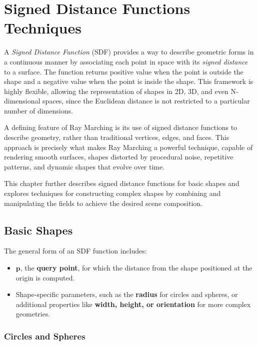 \chapter{Signed Distance Functions Techniques}\label{chp:LABEL_CHP_3}

A \textit{Signed Distance Function} (SDF) provides a way to describe geometric forms in a continuous manner by associating each point in space with its \textit{signed distance} to a surface. The function returns positive value when the point is outside the shape and a negative value when the point is inside the shape. This framework is highly flexible, allowing the representation of shapes in 2D, 3D, and even N-dimensional spaces, since the Euclidean distance is not restricted to a particular number of dimensions.  

A defining feature of Ray Marching is its use of signed distance functions to describe geometry, rather than traditional vertices, edges, and faces. This approach is precisely what makes Ray Marching a powerful technique, capable of rendering smooth surfaces, shapes distorted by procedural noise, repetitive patterns, and dynamic shapes that evolve over time.
    
This chapter further describes signed distance functions for basic shapes and explores techniques for constructing complex shapes by combining and manipulating the fields to achieve the desired scene composition.


\section{Basic Shapes}


The general form of an SDF function includes:  

\begin{itemize}
    \item $\mathbf{p}$, the \textbf{query point}, for which the distance from the shape positioned at the origin is computed.
    \item Shape-specific parameters, such as the \textbf{radius} for circles and spheres, or additional properties like \textbf{width, height, or orientation} for more complex geometries.
\end{itemize}

\subsection{Circles and Spheres}

